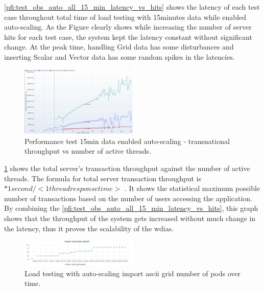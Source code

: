 \documentclass[conference]{IEEEtran}
\begin{document}
\cref{pfi:test_obs_auto_all_15_min_latency_vs_hits} shows the latency of each test case throughout total time of load testing with 15minutes data while enabled auto-scaling. As the Figure clearly shows while increasing the number of server hits for each test case, the system kept the latency constant without significant change. At the peak time, handling Grid data has some disturbances and inserting Scalar and Vector data has some random spikes in the latencies.

\begin{figure}[htbp]
\centerline{\includegraphics[width=0.5\textwidth]{results/obs/all_auto/obs_all_auto_15m_transaction_throughtput_vs_threads.png}}
\caption{Performance test 15min data enabled auto-scaling - transnational throughput vs number of active threads.}
\label{pfi:test_obs_auto_all_15_min_throughput_vs_threads}
\end{figure}

\cref{pfi:test_obs_auto_all_15_min_throughput_vs_threads} shows the total server's transaction throughput against the number of active threads.
The formula for total server transaction throughput is \(<active threads> * 1 second / <1  thread response time>\) \cite{JMeterPluginsTransactionPlugin}. It shows the statistical maximum possible number of transactions based on the number of users accessing the application.
By combining the \cref{pfi:test_obs_auto_all_15_min_latency_vs_hits}, this graph shows that the throughput of the system gets increased without much change in the latency, thus it proves the scalability of the \acrshort{wdias}.

\begin{figure}[htp]
    \centering
    \includegraphics[width=0.5\textwidth]{results/obs/all_auto/obs_all_auto_15m_import_grid_pod.png}
    \caption{Load testing with auto-scaling import ascii grid number of pods over time.}
    \label{pfi:obs_all_auto_15m_import_grid_pod}
\end{figure}
\end{document}

